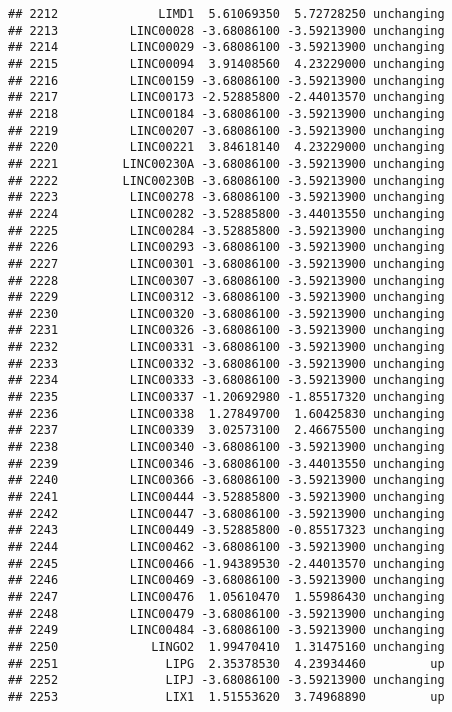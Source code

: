 \documentclass[]{article}
\begin{document}
\begin{verbatim}
## 2212              LIMD1  5.61069350  5.72728250 unchanging
## 2213          LINC00028 -3.68086100 -3.59213900 unchanging
## 2214          LINC00029 -3.68086100 -3.59213900 unchanging
## 2215          LINC00094  3.91408560  4.23229000 unchanging
## 2216          LINC00159 -3.68086100 -3.59213900 unchanging
## 2217          LINC00173 -2.52885800 -2.44013570 unchanging
## 2218          LINC00184 -3.68086100 -3.59213900 unchanging
## 2219          LINC00207 -3.68086100 -3.59213900 unchanging
## 2220          LINC00221  3.84618140  4.23229000 unchanging
## 2221         LINC00230A -3.68086100 -3.59213900 unchanging
## 2222         LINC00230B -3.68086100 -3.59213900 unchanging
## 2223          LINC00278 -3.68086100 -3.59213900 unchanging
## 2224          LINC00282 -3.52885800 -3.44013550 unchanging
## 2225          LINC00284 -3.52885800 -3.59213900 unchanging
## 2226          LINC00293 -3.68086100 -3.59213900 unchanging
## 2227          LINC00301 -3.68086100 -3.59213900 unchanging
## 2228          LINC00307 -3.68086100 -3.59213900 unchanging
## 2229          LINC00312 -3.68086100 -3.59213900 unchanging
## 2230          LINC00320 -3.68086100 -3.59213900 unchanging
## 2231          LINC00326 -3.68086100 -3.59213900 unchanging
## 2232          LINC00331 -3.68086100 -3.59213900 unchanging
## 2233          LINC00332 -3.68086100 -3.59213900 unchanging
## 2234          LINC00333 -3.68086100 -3.59213900 unchanging
## 2235          LINC00337 -1.20692980 -1.85517320 unchanging
## 2236          LINC00338  1.27849700  1.60425830 unchanging
## 2237          LINC00339  3.02573100  2.46675500 unchanging
## 2238          LINC00340 -3.68086100 -3.59213900 unchanging
## 2239          LINC00346 -3.68086100 -3.44013550 unchanging
## 2240          LINC00366 -3.68086100 -3.59213900 unchanging
## 2241          LINC00444 -3.52885800 -3.59213900 unchanging
## 2242          LINC00447 -3.68086100 -3.59213900 unchanging
## 2243          LINC00449 -3.52885800 -0.85517323 unchanging
## 2244          LINC00462 -3.68086100 -3.59213900 unchanging
## 2245          LINC00466 -1.94389530 -2.44013570 unchanging
## 2246          LINC00469 -3.68086100 -3.59213900 unchanging
## 2247          LINC00476  1.05610470  1.55986430 unchanging
## 2248          LINC00479 -3.68086100 -3.59213900 unchanging
## 2249          LINC00484 -3.68086100 -3.59213900 unchanging
## 2250             LINGO2  1.99470410  1.31475160 unchanging
## 2251               LIPG  2.35378530  4.23934460         up
## 2252               LIPJ -3.68086100 -3.59213900 unchanging
## 2253               LIX1  1.51553620  3.74968890         up

\end{verbatim}
\end{document}
